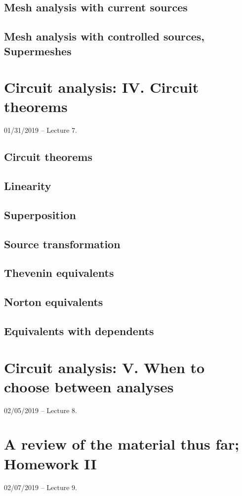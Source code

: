 \documentclass[11pt]{book}
\begin{document}
\section{Mesh analysis with current sources}
\section{Mesh analysis with controlled sources, \textbf{Supermeshes}}



\chapter{Circuit analysis: IV. Circuit theorems}
01/31/2019 – Lecture 7. 
\section{Circuit theorems}
\section{Linearity}
\section{Superposition}
\section{Source transformation}
\section{Thevenin equivalents}
\section{Norton equivalents}
\section{Equivalents with dependents}



\chapter{Circuit analysis: V. When to choose between analyses}
02/05/2019 – Lecture 8. 

\chapter{A review of the material thus far; Homework II}
02/07/2019 – Lecture 9. 
\end{document}
